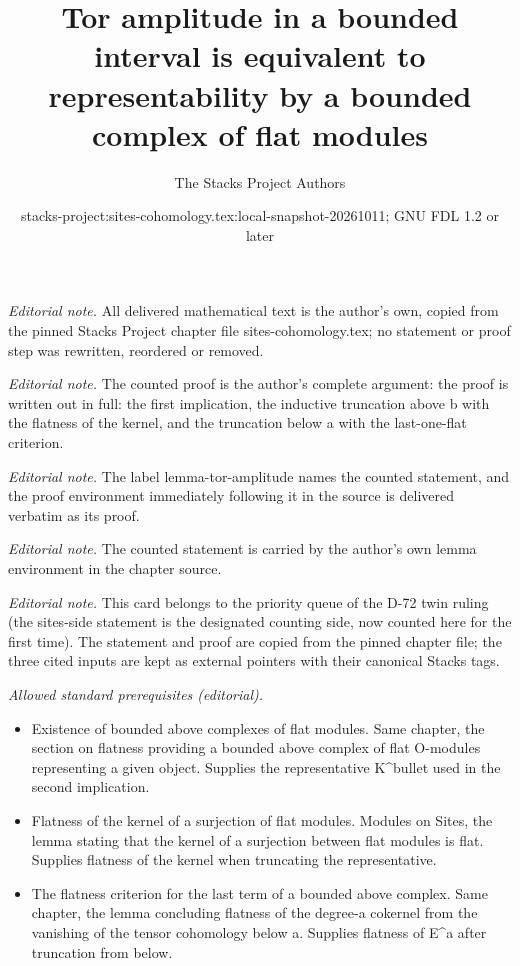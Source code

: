 \documentclass[10pt,a4paper]{amsart}
\title{Tor amplitude in a bounded interval is equivalent to representability by a bounded complex of flat modules}
\author{The Stacks Project Authors}
\date{stacks-project:sites-cohomology.tex:local-snapshot-20261011; GNU FDL 1.2 or later}
\theoremstyle{plain}
\theoremstyle{definition}
\theoremstyle{remark}
\numberwithin{equation}{subsection}
\begin{document}
\maketitle
\noindent\textit{Editorial note.} All delivered mathematical text is the author's own, copied from the pinned Stacks Project chapter file sites-cohomology.tex; no statement or proof step was rewritten, reordered or removed.\par\medskip
\noindent\textit{Editorial note.} The counted proof is the author's complete argument: the proof is written out in full: the first implication, the inductive truncation above b with the flatness of the kernel, and the truncation below a with the last-one-flat criterion.\par\medskip
\noindent\textit{Editorial note.} The label lemma-tor-amplitude names the counted statement, and the proof environment immediately following it in the source is delivered verbatim as its proof.\par\medskip
\noindent\textit{Editorial note.} The counted statement is carried by the author's own lemma environment in the chapter source.\par\medskip
\noindent\textit{Editorial note.} This card belongs to the priority queue of the D-72 twin ruling (the sites-side statement is the designated counting side, now counted here for the first time). The statement and proof are copied from the pinned chapter file; the three cited inputs are kept as external pointers with their canonical Stacks tags.\par\medskip
\noindent\textit{Allowed standard prerequisites (editorial).}\begin{itemize}
\item Existence of bounded above complexes of flat modules. Same chapter, the section on flatness providing a bounded above complex of flat O-modules representing a given object. Supplies the representative K\textasciicircum{}bullet used in the second implication.
\item Flatness of the kernel of a surjection of flat modules. Modules on Sites, the lemma stating that the kernel of a surjection between flat modules is flat. Supplies flatness of the kernel when truncating the representative.
\item The flatness criterion for the last term of a bounded above complex. Same chapter, the lemma concluding flatness of the degree-a cokernel from the vanishing of the tensor cohomology below a. Supplies flatness of E\textasciicircum{}a after truncation from below.
\end{itemize}\medskip
\end{document}
